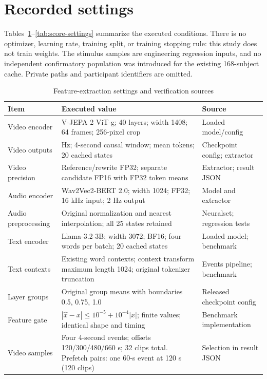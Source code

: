 \section{Recorded settings}
Tables~\ref{tab:feature-settings}--\ref{tab:score-settings} summarize the executed
conditions. There is no optimizer, learning rate, training split, or training
stopping rule: this study does not train weights. The stimulus samples are
engineering regression inputs, and no independent confirmatory population was
introduced for the existing 168-subject cache. Private paths and participant identifiers are omitted.

\begin{table}[htbp]\centering\sffamily\small
\caption{Feature-extraction settings and verification sources}
\label{tab:feature-settings}
\begin{tabular}{@{}>{\raggedright\arraybackslash}p{.21\linewidth}>{\raggedright\arraybackslash}p{.49\linewidth}>{\raggedright\arraybackslash}p{.24\linewidth}@{}}\toprule
Item & Executed value & Source \\\midrule
Video encoder & V-JEPA 2 ViT-g; 40 layers; width 1408; 64 frames; 256-pixel crop & Loaded model/config \\
Video outputs & 2 Hz; 4-second causal window; mean tokens; 20 cached states & Checkpoint config; extractor \\
Video precision & Reference/rewrite FP32; separate candidate FP16 with FP32 token means & Extractor; result JSON \\
Audio encoder & Wav2Vec2-BERT 2.0; width 1024; FP32; 16 kHz input; 2 Hz output & Model and extractor \\
Audio preprocessing & Original normalization and nearest interpolation; all 25 states retained & Neuralset; regression tests \\
Text encoder & Llama-3.2-3B; width 3072; BF16; four words per batch; 20 cached states & Loaded model; benchmark \\
Text contexts & Existing word contexts; context transform maximum length 1024; original tokenizer truncation & Events pipeline; benchmark \\
Layer groups & Original group means with boundaries 0.5, 0.75, 1.0 & Released checkpoint config \\
Feature gate & $|\widehat{x}-x|\leq10^{-5}+10^{-4}|x|$; finite values; identical shape and timing & Benchmark implementation \\
Video samples & Four 4-second events; offsets 120/300/480/660 s; 32 clips total. Prefetch pairs: one 60-s event at 120 s (120 clips) & Selection in result JSON \\

\end{tabular}
\end{table}
